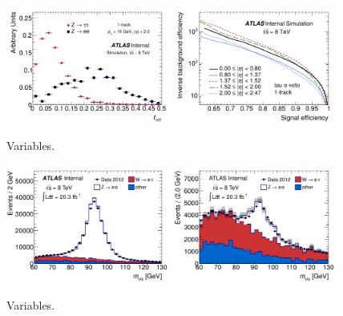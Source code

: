 \begin{figure}[tp]
  \centering
  \includegraphics[width=0.48\textwidth]{figures/PERF-2013-06_tmp/TRTHTOverLT_LeadTrk}
  \includegraphics[width=0.48\textwidth]{figures/PERF-2013-06_tmp/ROC_ymin5_smoothcurve}
  \caption{Variables.}
  \label{fig:taus-electronfakes1}
\end{figure}

\begin{figure}[tp]
  \centering
  \includegraphics[width=0.48\textwidth]{figures/PERF-2013-06_tmp/eveto_mvis_mediumID_loosePPOLR_noeveto}
  \includegraphics[width=0.48\textwidth]{figures/PERF-2013-06_tmp/eveto_mvis_mediumID_loosePPOLR_looseeveto}
  \caption{Variables.}
  \label{fig:taus-electronfakes2}
\end{figure}


